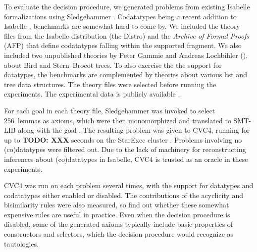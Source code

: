 To evaluate the decision procedure, we generated problems from existing
Isabelle formalizations using Sledgehammer \cite{paulson-blanchette-2010}.
Codatatypes being a recent addition to Isabelle
\cite{blanchette-et-al-2014-impl}, benchmarks are somewhat hard to come by. We
included the theory files from the Isabelle distribution (the Distro) and the \emph{Archive
of Formal Proofs} (AFP) \cite{klein-et-al-afp} that define codatatypes falling
within the supported fragment. We also included two unpublished theories by
Peter Gammie and Andreas Lochbihler (\gandl), about Bird and Stern--Brocot trees.
To also exercise the the support
for datatypes, the benchmarks are complemented by theories about various list
and tree data structures. The theory files were selected before running the
experiments. The experimental data is publicly available \cite{our-eval-data}.

For each goal in each theory file, Sledgehammer was invoked to select
256~lemmas as axioms, which were then monomorphized and translated to SMT-LIB
along with the goal \cite{boehme-2012-phd}. The resulting problem was given to
CVC4, running for up to \textbf{TODO: XXX} seconds on the StarExec cluster
\cite{xxx}. Problems involving no (co)datatypes were filtered out.
Due to the lack of machinery for reconstructing inferences about (co)datatypes
in Isabelle, CVC4 is trusted as an oracle in these experiments.

CVC4 was run on each problem several times, with the support for datatypes and
codatatypes either enabled or disabled. The contributions of the acyclicity and
bisimilarity rules were also measured, so find out whether these somewhat
expensive rules are useful in practice. Even when the decision procedure is
disabled, some of the generated axioms typically include basic properties of
constructors and selectors, which the decision procedure would recognize as
tautologies.

\newcommand\BAD[1]{\textcolor{red}{\textbf{#1}}}



